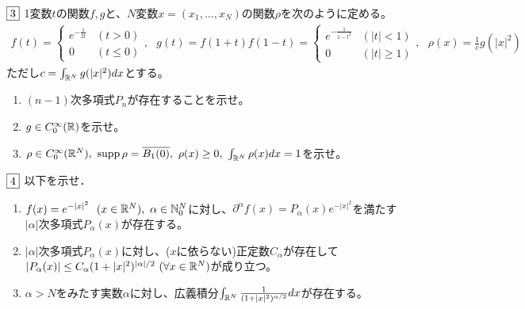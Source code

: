 \documentclass[dvipdfmx, leqno]{jsreport}
\begin{document}
\begin{tcolorbox}$\fbox{3}$
    1変数$t$の関数$f, g$と、$N$変数$x= (x_1, \ldots, x_N)$の関数$\rho$を次のように定める。
\begin{align*}
    f(t)= 
\begin{cases}
    e^{-\frac{1}{2t}} &(t> 0)\\
    0 &(t\le 0)
\end{cases},\ \ \ 
    g(t)= f(1+ t)f(1 -t)= 
\begin{cases}
    e^{-\frac{1}{1- t^2}} &(|t|< 1)\\
    0 &(|t|\ge 1)
\end{cases},\ \ \ 
    \rho(x)= \frac{1}{c}g(|x|^2)    
\end{align*}
    ただし$c= \int_{\mathbb{R}^N} g(|x|^2)dx$とする。
\begin{enumerate}
    \item $(n- 1)$次多項式$P_n$が存在することを示せ。
    \item $g\in C^\infty_0(\mathbb{R})$を示せ。
    \item $\rho\in C^\infty_0(\R^N),\ \supp{\rho}= \bar{B_1(0)},\ \rho(x)\ge 0,\ \int_{\R^N} \rho(x)dx= 1$を示せ。
\end{enumerate}
\end{tcolorbox}
\begin{tcolorbox}$\fbox{4}$
    以下を示せ．
\begin{enumerate}
    \item $f(x)= e^{-|x|^2}\ \ (x\in \R^N),\ \alpha\in \N^N_0$に対し、$\partial^\alpha f(x)= P_\alpha(x)e^{-|x|^2}$を満たす$|\alpha|$次多項式$P_\alpha(x)$が存在する。
    \item $|\alpha|$次多項式$P_\alpha(x)$に対し、($x$に依らない)正定数$C_\alpha$が存在して$|P_\alpha(x)|\le C_\alpha(1+ |x|^2)^{|\alpha|/2}\ (\forall x\in \R^N)$が成り立つ。
    \item $\alpha> N$をみたす実数$\alpha$に対し、広義積分$\int_{\mathbb{R}^N} \frac{1}{(1+ |x|^2)^{\alpha/2}}dx$が存在する。
\end{enumerate}
\end{tcolorbox}
\end{document}
